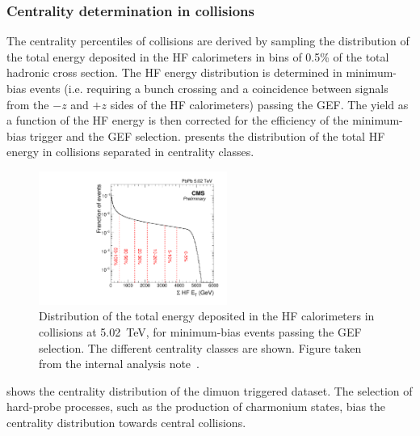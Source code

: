 
\subsubsection{Centrality determination in \RunPbPb collisions}

The centrality percentiles of \RunPbPb collisions are derived by sampling the distribution of the total energy deposited in the HF calorimeters in bins of 0.5\% of the total hadronic cross section. The HF energy distribution is determined in minimum-bias events (i.e. requiring a bunch crossing and a coincidence between signals from the $-z$ and $+z$ sides of the HF calorimeters) passing the GEF. The yield as a function of the HF energy is then corrected for the efficiency of the minimum-bias trigger and the GEF selection.  presents the distribution of the total HF energy in \RunPbPb collisions separated in centrality classes.

\begin{figure}[htb!]
 \centering
 \includegraphics[width=0.55\textwidth]{Figures/Charmonia/Analysis/EventSelection/EHF.pdf}
 \caption{Distribution of the total energy deposited in the HF calorimeters in \RunPbPb collisions at \SI{5.02}{\TeV}, for minimum-bias events passing the GEF selection. The different centrality classes are shown. Figure taken from the internal analysis note~\cite{Centrality_PbPb}.}
 \label{fig:energyHF}
\end{figure}

 shows the centrality distribution of the dimuon triggered \RunPbPb dataset. The selection of hard-probe processes, such as the production of charmonium states, bias the centrality distribution towards central collisions. 

